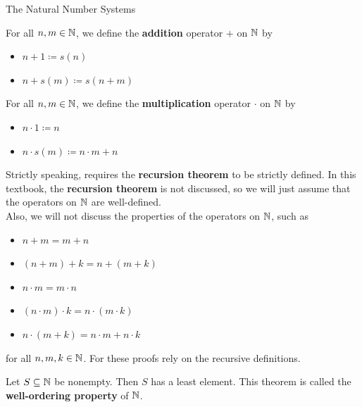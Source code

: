 \begin{section}{The Natural Number Systems}
\bigskip

\begin{definition} \label{def:OperationsOnN}
    For all $n, m \in \mathbb{N}$, we define the \textbf{addition} operator $+$ on $\mathbb{N}$ by
    \begin{itemize}
        \item $n + 1 \coloneqq s(n)$
        \item $n + s(m) \coloneqq s(n + m)$
    \end{itemize}
    For all $n, m \in \mathbb{N}$, we define the \textbf{multiplication} operator $\cdot$ on $\mathbb{N}$ by
    \begin{itemize}
        \item $n \cdot 1 \coloneqq n$
        \item $n \cdot s(m) \coloneqq n \cdot m + n$
    \end{itemize}
\end{definition}

\bigskip

\begin{remark}
    Strictly speaking,  requires the \textbf{recursion theorem} to be strictly defined.
    In this textbook, the \textbf{recursion theorem} is not discussed, so we will just assume that the operators
    on $\mathbb{N}$ are well-defined.
    \\[6mm]
    Also, we will not discuss the properties of the operators on $\mathbb{N}$, such as
    \begin{itemize}
        \item $n + m = m + n$
        \item $(n + m) + k = n + (m + k)$
        \item $n \cdot m = m \cdot n$
        \item $(n \cdot m) \cdot k = n \cdot (m \cdot k)$
        \item $n \cdot (m + k) = n \cdot m + n \cdot k$
    \end{itemize}
    for all $n, m, k \in \mathbb{N}$. For these proofs rely on the recursive definitions.
\end{remark}

\bigskip

\begin{theorem} \label{thm:WellOrderingProperty}
    Let $S \subseteq \mathbb{N}$ be nonempty. Then $S$ has a least element.
    This theorem is called the \textbf{well-ordering property} of $\mathbb{N}$.
\end{theorem}


\end{section}
